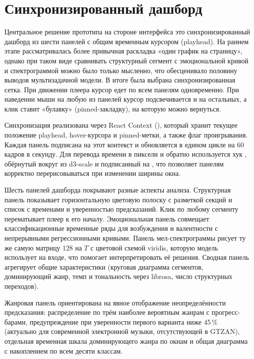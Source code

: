 \section{Синхронизированный дашборд}\label{sec:6-2}

Центральное решение прототипа на стороне интерфейса это синхронизированный дашборд из шести панелей с общим временным курсором (playhead). На раннем этапе рассматривалась более привычная раскладка «один график на страницу», однако при таком виде сравнивать структурный сегмент с эмоциональной кривой и спектрограммой можно было только мысленно, что обесценивало половину выводов мультизадачной модели. В итоге была выбрана синхронизированная сетка. При движении плеера курсор едет по всем панелям одновременно. При наведении мыши на любую из панелей курсор подсвечивается и на остальных, а клик ставит «булавку» (pinned-закладку), на которую можно вернуться.

Синхронизация реализована через React Context (), который хранит текущее положение playhead, hover-курсора и pinned-метки, а также флаг проигрывания. Каждая панель подписана на этот контекст и обновляется в едином цикле  на 60 кадров в секунду. Для перевода времени в пиксели и обратно используется хук , обёрнутый вокруг  из d3-scale и подписанный на , что позволяет панелям корректно перерисовываться при изменении ширины окна.

Шесть панелей дашборда покрывают разные аспекты анализа. Структурная панель показывает горизонтальную цветовую полоску с разметкой секций и список с временами и уверенностью предсказаний. Клик по любому сегменту перематывает плеер к его началу. Эмоциональная панель совмещает классификационные временные ряды для возбуждения и валентности с непрерывными регрессионными кривыми. Панель мел-спектрограммы рисует ту же самую матрицу 128 на $T$ с цветовой схемой viridis, которую модель использует на входе, что помогает интерпретировать её решения. Сводная панель агрегирует общие характеристики (круговая диаграмма сегментов, доминирующий жанр, темп и тональность через librosa, число структурных переходов).

Жанровая панель ориентирована на явное отображение неопределённости предсказания: распределение по трём наиболее вероятным жанрам с прогресс-барами, предупреждение при уверенности первого варианта ниже 45\,\% (актуально для современной электронной музыки, отсутствующей в GTZAN), отдельная временная шкала доминирующего жанра по окнам и общая диаграмма с накоплением по всем десяти классам.

